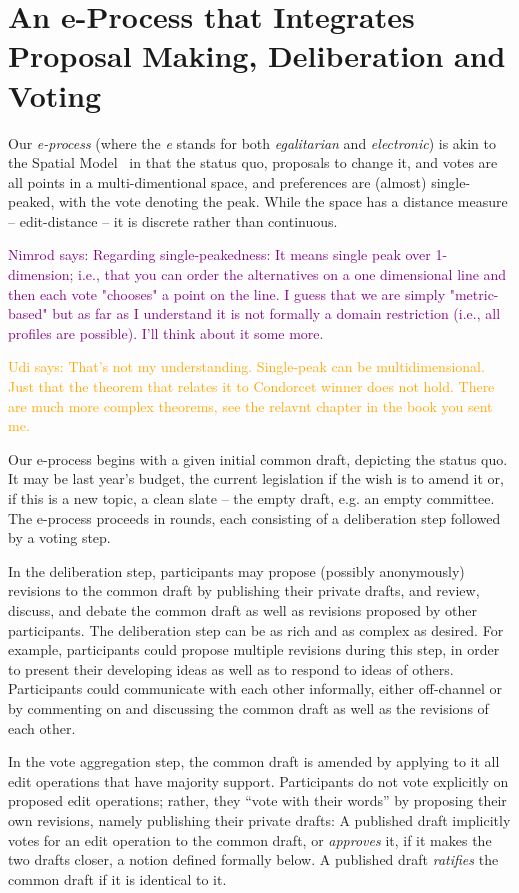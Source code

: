 \documentclass{llncs}
\newcommand{\nimrod}[1]{\textcolor{purple}{Nimrod says: #1}}
\newcommand{\udi}[1]{\textcolor{orange}{Udi says: #1}}
\begin{document}
\section{An e-Process that Integrates Proposal Making, Deliberation and Voting}\label{section:our process}

Our \emph{e-process} (where the \emph{e} stands for both \emph{egalitarian} and \emph{electronic}) is akin to the Spatial Model~\cite{SpatialModel} in that the status quo, proposals to change it, and votes are all points in a multi-dimentional space, and preferences  are (almost) single-peaked, with the vote denoting the peak.  While the space has a distance measure -- edit-distance -- it is discrete rather than continuous.

\nimrod{Regarding single-peakedness: It means single peak over 1-dimension; i.e., that you can order the alternatives on a one dimensional line and then each vote "chooses" a point on the line. I guess that we are simply "metric-based" but as far as I understand it is not formally a domain restriction (i.e., all profiles are possible). I'll think about it some more.}

\udi{That's not my understanding.  Single-peak can be multidimensional.  Just that the theorem that relates it to Condorcet winner does not hold. 
There are much more complex theorems, see the relavnt chapter in the book you sent me.}

Our e-process begins with a given initial common draft, depicting the status quo.  It may be last year's budget, the current legislation if the wish is to amend it or, if this is a new topic, a clean slate -- the empty draft, e.g. an  empty committee.  The e-process proceeds in rounds, each consisting of a deliberation step followed by a voting step. 

In the deliberation step,
participants may propose (possibly anonymously) revisions to the common draft by publishing their private drafts,  and review, discuss, and debate the common draft as well as revisions proposed by other participants. The deliberation step can be as rich and as complex as desired. For example, participants could propose multiple revisions during this step, in order to present their developing ideas as well as to respond to ideas of others. Participants could communicate with each other informally, either off-channel or by commenting on and discussing the common draft as well as the revisions of each other. 

In the vote aggregation step, the common draft is amended by applying to it all edit operations that have majority support. Participants do not vote explicitly on proposed edit operations; rather, they ``vote with their words'' by proposing their own revisions, namely publishing their private drafts:  A published draft implicitly votes for an edit operation to the common draft, or \emph{approves} it, if it makes the two drafts closer, a notion defined formally below.  A published draft \emph{ratifies} the common draft if it is identical to it.
\end{document}
